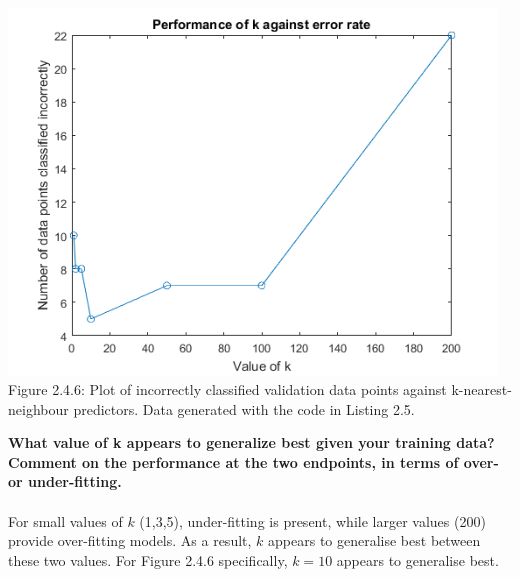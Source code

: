 \documentclass[]{report}   %
\begin{document}
\begin{center}
	\includegraphics[width=35em]{2_4_Figure_6.png}
	{Figure 2.4.6: Plot of incorrectly classified validation data points against k-nearest-neighbour predictors. Data generated with the code in Listing 2.5.}
\end{center} 
{\bf What value of k appears to generalize best given your training data? Comment on the performance at the two endpoints, in terms of over- or under-fitting.} \\~\\
{For small values of $k$ (1,3,5), under-fitting is present, while larger values (200) provide over-fitting models. As a result, $k$ appears to generalise best between these two values. For Figure 2.4.6 specifically, $k = 10$ appears to generalise best.}
\end{document}
